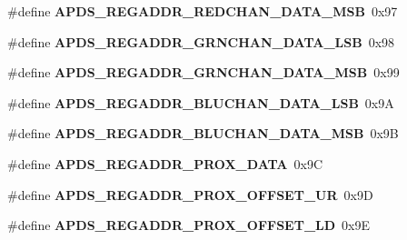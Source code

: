 \begin{DoxyCompactItemize}
\#define {\bfseries A\+P\+D\+S\+\_\+\+R\+E\+G\+A\+D\+D\+R\+\_\+\+R\+E\+D\+C\+H\+A\+N\+\_\+\+D\+A\+T\+A\+\_\+\+M\+SB}~0x97
\item 
\mbox{\label{group__APDS9960__FunctionDefines_ga73c9363d4707978cae36506fad158b2e}} 
\#define {\bfseries A\+P\+D\+S\+\_\+\+R\+E\+G\+A\+D\+D\+R\+\_\+\+G\+R\+N\+C\+H\+A\+N\+\_\+\+D\+A\+T\+A\+\_\+\+L\+SB}~0x98
\item 
\mbox{\label{group__APDS9960__FunctionDefines_gaefc7877f815dacc37449238775cfe03f}} 
\#define {\bfseries A\+P\+D\+S\+\_\+\+R\+E\+G\+A\+D\+D\+R\+\_\+\+G\+R\+N\+C\+H\+A\+N\+\_\+\+D\+A\+T\+A\+\_\+\+M\+SB}~0x99
\item 
\mbox{\label{group__APDS9960__FunctionDefines_ga637767863573dae0148ddeb28537a30a}} 
\#define {\bfseries A\+P\+D\+S\+\_\+\+R\+E\+G\+A\+D\+D\+R\+\_\+\+B\+L\+U\+C\+H\+A\+N\+\_\+\+D\+A\+T\+A\+\_\+\+L\+SB}~0x9A
\item 
\mbox{\label{group__APDS9960__FunctionDefines_gab13cc76fee59c81c4d9a68e99f527eff}} 
\#define {\bfseries A\+P\+D\+S\+\_\+\+R\+E\+G\+A\+D\+D\+R\+\_\+\+B\+L\+U\+C\+H\+A\+N\+\_\+\+D\+A\+T\+A\+\_\+\+M\+SB}~0x9B
\item 
\mbox{\label{group__APDS9960__FunctionDefines_ga26f37dd3323c260ca8afbbbacad4cc16}} 
\#define {\bfseries A\+P\+D\+S\+\_\+\+R\+E\+G\+A\+D\+D\+R\+\_\+\+P\+R\+O\+X\+\_\+\+D\+A\+TA}~0x9C
\item 
\mbox{\label{group__APDS9960__FunctionDefines_ga95aff4bd37022bf0256144c3bd0f033c}} 
\#define {\bfseries A\+P\+D\+S\+\_\+\+R\+E\+G\+A\+D\+D\+R\+\_\+\+P\+R\+O\+X\+\_\+\+O\+F\+F\+S\+E\+T\+\_\+\+UR}~0x9D
\item 
\mbox{\label{group__APDS9960__FunctionDefines_gae49a88c57d8f1dd61c05d7c68a8be7a0}} 
\#define {\bfseries A\+P\+D\+S\+\_\+\+R\+E\+G\+A\+D\+D\+R\+\_\+\+P\+R\+O\+X\+\_\+\+O\+F\+F\+S\+E\+T\+\_\+\+LD}~0x9E
\item 
\mbox{\label{group__APDS9960__FunctionDefines_ga45b80c18b85369f4d46e9668975454dd}} 

\end{DoxyCompactItemize}
